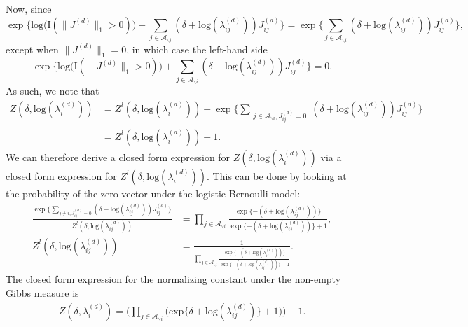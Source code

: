   	 Now, since 
  	\begin{equation*}
  	\exp\Big\{ \mbox{log}\big(\text{I}(\lVert J^{(d)} \rVert_1> 0 )\big) + \sum_{j \in \mathcal{A}_{\backslash i}} (\delta+\mbox{log}(\lambda_{ij}^{(d)}))J_{ij}^{(d)} \Big\}= \exp\Big\{ \sum_{j \in \mathcal{A}_{\backslash i}} (\delta+\mbox{log}(\lambda_{ij}^{(d)}))J_{ij}^{(d)} \Big\},
  	\end{equation*} except when $\lVert J^{(d)} \rVert_1=0$, in which case the left-hand side 
  	\begin{equation*}
\exp\Big\{ \mbox{log}\big(\text{I}(\lVert J^{(d)} \rVert_1> 0 )\big) + \sum_{j \in \mathcal{A}_{\backslash i}} (\delta+\mbox{log}(\lambda_{ij}^{(d)}))J_{ij}^{(d)} \Big\}= 0.  	
\end{equation*}
 As such, we note that 
 \begin{equation*}
 \begin{aligned}
Z(\delta,\mbox{log}(\lambda_{i}^{(d)}))& = Z^{l}(\delta,\mbox{log}(\lambda_{i}^{(d)})) -  \exp\Big\{ \sum\limits_{\substack{j \in \mathcal{A}_{\backslash i}, J^{(d)}_{ij}=0}} (\delta+\mbox{log}(\lambda_{ij}^{(d)}))J_{ij}^{(d)} \Big\}
\\& = Z^{l}(\delta,\mbox{log}(\lambda_{i}^{(d)})) -  1.
\end{aligned}
 \end{equation*}
   We can therefore derive a closed form expression for $Z(\delta,\mbox{log}(\lambda_{i}^{(d)}))$ via a closed form expression for $Z^{l}(\delta,\mbox{log}(\lambda_{i}^{(d)}))$. This can be done by looking at the probability of the zero vector under the logistic-Bernoulli model:
   \begin{equation*}
   \begin{aligned}
\frac{\exp\Big\{\sum_{j\neq i, J^{(d)}_{ij}=0} (\delta+\mbox{log}(\lambda_{ij}^{(d)}))J_{ij}^{(d)} \Big\}}{Z^{l}(\delta,\mbox{log}(\lambda_{ij}^{(d)}))} &= \prod_{j \in \mathcal{A}_{\backslash i} }   \frac{ \exp\{-(\delta+\mbox{log}(\lambda_{ij}^{(d)}))\}}{\exp\{-(\delta+\mbox{log}(\lambda_{ij}^{(d)}))\} + 1},\\
Z^{l}(\delta,\mbox{log}(\lambda_{ij}^{(d)})) &= \frac{1}{\prod_{j \in \mathcal{A}_{\backslash i}}   \frac{ \exp\{-(\delta+\mbox{log}(\lambda_{ij}^{(d)}))\}}{\exp\{-(\delta+\mbox{log}(\lambda_{ij}^{(d)}))\} + 1}}.
  	 \end{aligned}  
  	 \end{equation*}
  	 The closed form expression for the normalizing constant under the non-empty Gibbs measure is  \begin{equation*}
  	 \begin{aligned}Z(\delta,\lambda_i^{(d)}) = \Big(\prod_{j \in \mathcal{A}_{\backslash i}} \Big(\mbox{exp}\{\delta+\mbox{log}(\lambda_{ij}^{(d)})\} + 1\Big)\Big)-1.
  	  \end{aligned}  
  	  \end{equation*}
